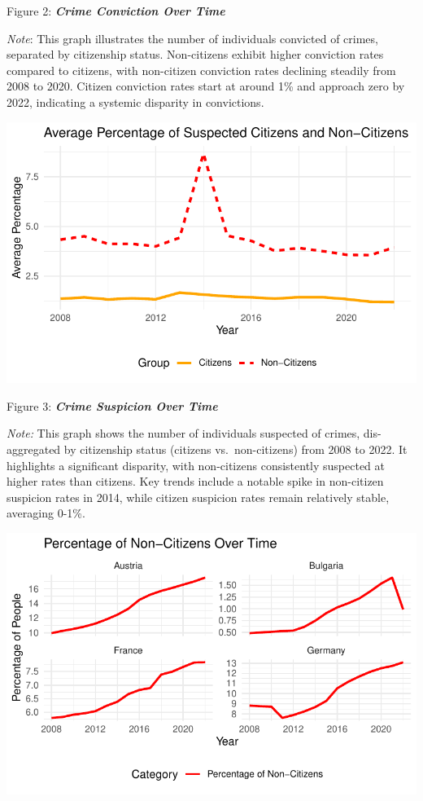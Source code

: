 \documentclass[
]{article}
\begin{document}
Figure 2: \textbf{\emph{Crime Conviction Over Time}}

\emph{Note}: This graph illustrates the number of individuals convicted
of crimes, separated by citizenship status. Non-citizens exhibit higher
conviction rates compared to citizens, with non-citizen conviction rates
declining steadily from 2008 to 2020. Citizen conviction rates start at
around 1\% and approach zero by 2022, indicating a systemic disparity in
convictions.

\includegraphics{DataMan_Project_files/figure-pdf/unnamed-chunk-27-1.pdf}

Figure 3: \textbf{\emph{Crime Suspicion Over Time}}

\emph{Note:} This graph shows the number of individuals suspected of
crimes, dis-aggregated by citizenship status (citizens vs.~non-citizens)
from 2008 to 2022. It highlights a significant disparity, with
non-citizens consistently suspected at higher rates than citizens. Key
trends include a notable spike in non-citizen suspicion rates in 2014,
while citizen suspicion rates remain relatively stable, averaging 0-1\%.

\includegraphics{DataMan_Project_files/figure-pdf/unnamed-chunk-28-1.pdf}
\end{document}

